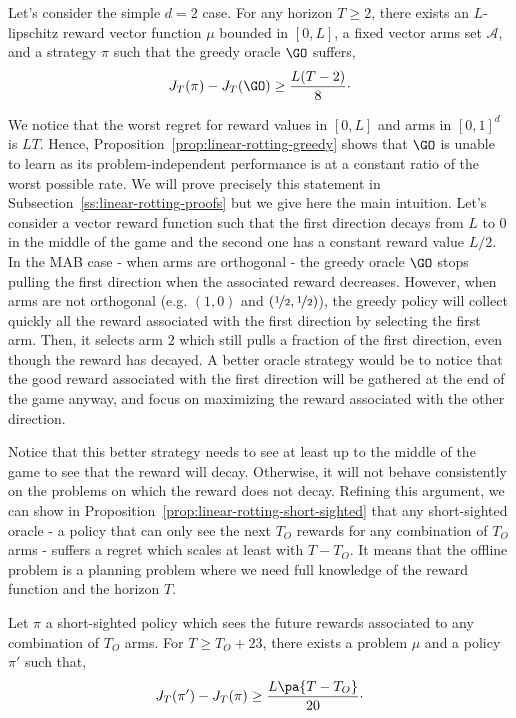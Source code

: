 \begin{proposition}
\label{prop:linear-rotting-greedy}
Let's consider the simple $d=2$ case. For any horizon $T\geq 2$, there exists an $L$-lipschitz reward vector function $\mu$ bounded in $[0,L]$, a fixed vector arms set $\mathcal{A}$, and a strategy $\pi$ such that the greedy oracle $\GO$ suffers,
\[
J_T(\pi) - J_T(\GO) \geq \frac{L(T-2)}{8}\cdot 
\]
\end{proposition}

We notice that the worst regret for reward values in $[0,L]$ and arms in $[0,1]^d$ is $LT$. Hence, Proposition~\ref{prop:linear-rotting-greedy} shows that $\GO$ is unable to learn as its problem-independent performance is at a constant ratio of the worst possible rate. We will prove precisely this statement in Subsection~\ref{ss:linear-rotting-proofs} but we give here the main intuition. Let's consider a vector reward function such that the first direction decays from $L$ to $0$ in the middle of the game and the second one has a constant reward value $L/2$. In the MAB case - when arms are orthogonal - the greedy oracle $\GO$ stops pulling the first direction when the associated reward decreases. However, when arms are not orthogonal (e.g. $(1,0)$ and $(\nicefrac{1}{2}, \nicefrac{1}{2})$), the greedy policy will collect quickly all the reward associated with the first direction by selecting the first arm. Then, it selects arm $2$ which still pulls a fraction of the first direction, even though the reward has decayed. A better oracle strategy would be to notice that the good reward associated with the first direction will be gathered at the end of the game anyway, and focus on maximizing the reward associated with the other direction.

Notice that this better strategy needs to see at least up to the middle of the game to see that the reward will decay. Otherwise, it will not behave consistently on the problems on which the reward does not decay. Refining this argument, we can show in Proposition~\ref{prop:linear-rotting-short-sighted} that any short-sighted oracle - \ie a policy that can only see the next $T_O$ rewards for any combination of $T_O$ arms - suffers a regret which scales at least with $T-T_O$. It means that the offline problem is a planning problem where we need full knowledge of the reward function and the horizon $T$.

\begin{proposition}
\label{prop:linear-rotting-short-sighted}
Let $\pi$ a short-sighted policy which sees the future rewards associated to any combination of $T_O$ arms. For $T \geq T_O + 23$, there exists a problem $\mu$ and a policy $\pi'$ such that,
\[
J_T(\pi') - J_T(\pi) \geq \frac{L\pa{T-T_O}}{20}\cdot
\]
\end{proposition}

